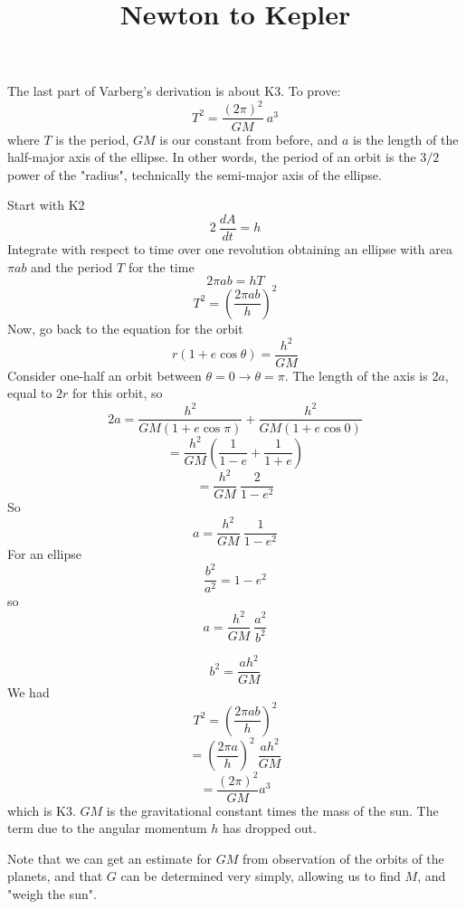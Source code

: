 \documentclass[11pt, oneside]{article}   	%
\title{Newton to Kepler}
\date{}							%
\begin{document}
\maketitle
\Large
\noindent

The last part of Varberg's derivation is about K3.  To prove:
\[ T^2 = \frac{(2 \pi)^2}{GM} \ a^3 \]
where $T$ is the period, $GM$ is our constant from before, and $a$ is the length of the half-major axis of the ellipse.  In other words, the period of an orbit is the $3/2$ power of the "radius", technically the semi-major axis of the ellipse.

Start with K2
\[ 2 \ \frac{dA}{dt} =  h \]
Integrate with respect to time over one revolution obtaining an ellipse with area $\pi a b$ and the period $T$ for the time
\[ 2 \pi a b = hT \]
\[ T^2 = (\frac{2 \pi a b}{h})^2 \]
Now, go back to the equation for the orbit
\[ r(1 + e \cos \theta) = \frac{h^2}{GM} \]
Consider one-half an orbit between $\theta = 0 \rightarrow \theta = \pi$.  The length of the axis is $2a$, equal to $2r$ for this orbit, so
\[ 2a = \frac{h^2}{GM(1 + e \cos \pi)} +  \frac{h^2}{GM(1 + e \cos 0)} \]
\[ = \frac{h^2}{GM} (\frac{1}{1 - e} +  \frac{1}{1 + e}) \]
\[ = \frac{h^2}{GM} \ \frac{2}{1 - e^2} \]
So
\[ a = \frac{h^2}{GM} \ \frac{1}{1 - e^2} \]
For an ellipse
\[ \frac{b^2}{a^2} = 1 - e^2 \]
so
\[ a = \frac{h^2}{GM} \ \frac{a^2}{b^2} \]

\[  b^2 = \frac{ah^2}{GM}  \]
We had 
\[ T^2 = (\frac{2 \pi a b}{h})^2 \]
\[ = (\frac{2 \pi a }{h})^2 \  \frac{ah^2}{GM}  \]
\[ = \frac{(2 \pi)^2}{GM} a^3 \]
which is K3.  $GM$ is the gravitational constant times the mass of the sun.  The term due to the angular momentum $h$ has dropped out.

Note that we can get an estimate for $GM$ from observation of the orbits of the planets, and that $G$ can be determined very simply, allowing us to find $M$, and "weigh the sun".
\end{document}
